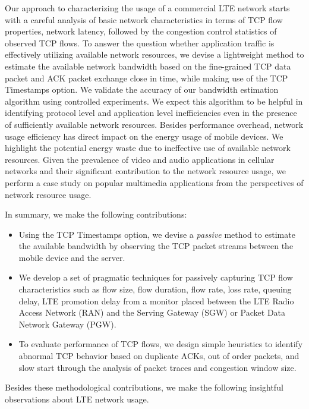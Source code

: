 Our approach to characterizing the usage of a commercial LTE network
starts with a careful analysis of basic network characteristics in terms
of TCP flow properties, network latency, followed by the congestion
control statistics of observed TCP flows. To answer the question 
whether application traffic is effectively utilizing available network
resources, we devise a lightweight method to estimate the available
network bandwidth based on the fine-grained TCP data packet and ACK
packet exchange close in time, while making use of the TCP Timestamps
option. We validate the accuracy of our bandwidth estimation
algorithm using controlled experiments. We expect this algorithm to be
helpful in identifying protocol level and application level
inefficiencies even in the presence of sufficiently available network
resources.  Besides performance overhead, network usage efficiency has
direct impact on the energy usage of mobile devices.
We highlight the potential energy waste due to ineffective use of available network resources.
Given the prevalence of video and audio applications in cellular networks and their significant contribution to the network
resource usage, we perform a case study on popular multimedia
applications from the perspectives of network resource usage. 


In summary, we make the following contributions:
\begin{itemize}
\item Using the TCP Timestamps option, we devise a {\em passive} method to estimate the
available bandwidth by observing the TCP packet streams between the mobile device and the server.
\item We develop a set of pragmatic techniques for passively capturing TCP flow
characteristics such as flow size, flow duration, flow rate, loss rate, queuing delay, LTE promotion delay
from a monitor placed between the LTE Radio Access Network (RAN) and
the Serving Gateway (SGW) or Packet Data Network Gateway (PGW).
\item To evaluate performance of TCP flows, we design simple
heuristics to identify abnormal TCP behavior based on duplicate ACKs,
out of order packets, and slow start through the analysis of packet
traces and congestion window size.
\end{itemize}

Besides these methodological contributions, we make the following
insightful observations about LTE network usage.

